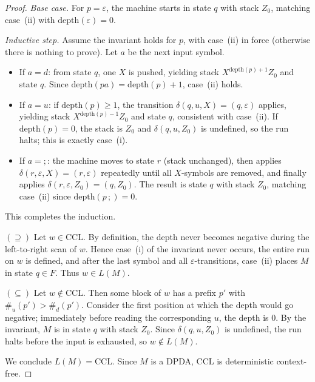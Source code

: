 \documentclass[11pt,a4paper]{article}
\begin{document}
\begin{proof}
\noindent\textit{Base case.}
For $p=\varepsilon$, the machine starts in state $q$ with stack $Z_0$,
matching case~(ii) with $\mathrm{depth}(\varepsilon)=0$.

\noindent\textit{Inductive step.}
Assume the invariant holds for $p$, with case~(ii) in force (otherwise
there is nothing to prove).
Let $a$ be the next input symbol.
\begin{itemize}
  \item If $a=d$: from state $q$, one $X$ is pushed, yielding stack
        $X^{\mathrm{depth}(p)+1}Z_0$ and state $q$.
        Since $\mathrm{depth}(pa)=\mathrm{depth}(p)+1$, case~(ii) holds.

  \item If $a=u$: if $\mathrm{depth}(p)\ge 1$, the transition
        $\delta(q,u,X)=(q,\varepsilon)$ applies, yielding stack
        $X^{\mathrm{depth}(p)-1}Z_0$ and state $q$, consistent with
        case~(ii).
        If $\mathrm{depth}(p)=0$, the stack is $Z_0$ and
        $\delta(q,u,Z_0)$ is undefined, so the run halts; this is exactly
        case~(i).

  \item If $a={;}$: the machine moves to state $r$ (stack unchanged),
        then applies $\delta(r,\varepsilon,X)=(r,\varepsilon)$ repeatedly
        until all $X$-symbols are removed, and finally applies
        $\delta(r,\varepsilon,Z_0)=(q,Z_0)$.
        The result is state $q$ with stack $Z_0$, matching case~(ii) since
        $\mathrm{depth}(p\,{;})=0$.
\end{itemize}
This completes the induction.

\smallskip
\noindent$(\supseteq)$
Let $w\in\mathrm{CCL}$.
By definition, the depth never becomes negative during the left-to-right
scan of $w$.
Hence case~(i) of the invariant never occurs, the entire run on $w$ is
defined, and after the last symbol and all $\varepsilon$-transitions,
case~(ii) places $M$ in state $q\in F$.
Thus $w\in L(M)$.

\smallskip
\noindent$(\subseteq)$
Let $w\notin\mathrm{CCL}$.
Then some block of $w$ has a prefix $p'$ with $\#_u(p')>\#_d(p')$.
Consider the first position at which the depth would go negative;
immediately before reading the corresponding $u$, the depth is $0$.
By the invariant, $M$ is in state $q$ with stack $Z_0$.
Since $\delta(q,u,Z_0)$ is undefined, the run halts before the input is
exhausted, so $w\notin L(M)$.

We conclude $L(M)=\mathrm{CCL}$.
Since $M$ is a DPDA, $\mathrm{CCL}$ is deterministic context-free.
\end{proof}
\end{document}
